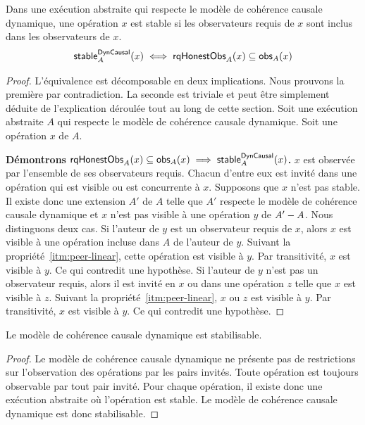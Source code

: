 \begin{theorem}\label{th:dyn-cs}
Dans une exécution abstraite qui respecte le modèle de cohérence causale dynamique, une opération $x$ est stable si les observateurs requis de $x$ sont inclus dans les observateurs de $x$.
\begin{equation*}
    \operatorname{\mathsf{stable}}_A^{\operatorname{\mathsf{DynCausal}}}(x) \iff \operatorname{\mathsf{rqHonestObs}}_A(x) \subseteq \operatorname{\mathsf{obs}}_A(x)
\end{equation*}
\end{theorem}

\begin{proof}
L'équivalence est décomposable en deux implications.
Nous prouvons la première par contradiction.
La seconde est triviale et peut être simplement déduite de l'explication déroulée tout au long de cette section.
Soit une exécution abstraite $A$ qui respecte le modèle de cohérence causale dynamique.
Soit une opération $x$ de $A$.

\textbf{Démontrons $\operatorname{\mathsf{rqHonestObs}}_A(x) \subseteq \operatorname{\mathsf{obs}}_A(x) \implies \operatorname{\mathsf{stable}}_A^{\operatorname{\mathsf{DynCausal}}}(x)$.}
$x$ est observée par l'ensemble de ses observateurs requis.
Chacun d'entre eux est invité dans une opération qui est visible ou est concurrente à $x$.
Supposons que $x$ n'est pas stable.
Il existe donc une extension $A'$ de $A$ telle que $A'$ respecte le modèle de cohérence causale dynamique et $x$ n'est pas visible à une opération $y$ de $A' - A$.
Nous distinguons deux cas.
Si l'auteur de $y$ est un observateur requis de $x$, alors $x$ est visible à une opération incluse dans $A$ de l'auteur de $y$.
Suivant la propriété~\ref{itm:peer-linear}, cette opération est visible à $y$.
Par transitivité, $x$ est visible à $y$.
Ce qui contredit une hypothèse.
Si l'auteur de $y$ n'est pas un observateur requis, alors il est invité en $x$ ou dans une opération $z$ telle que $x$ est visible à $z$.
Suivant la propriété~\ref{itm:peer-linear}, $x$ ou $z$ est visible à $y$.
Par transitivité, $x$ est visible à $y$.
Ce qui contredit une hypothèse.
\end{proof}


\begin{theorem}\label{th:stabilizable-dyn-causal}
Le modèle de cohérence causale dynamique est stabilisable.
\end{theorem}

\begin{proof}
Le modèle de cohérence causale dynamique ne présente pas de restrictions sur l'observation des opérations par les pairs invités.
Toute opération est toujours observable par tout pair invité.
Pour chaque opération, il existe donc une exécution abstraite où l'opération est stable.
Le modèle de cohérence causale dynamique est donc stabilisable.
\end{proof}

